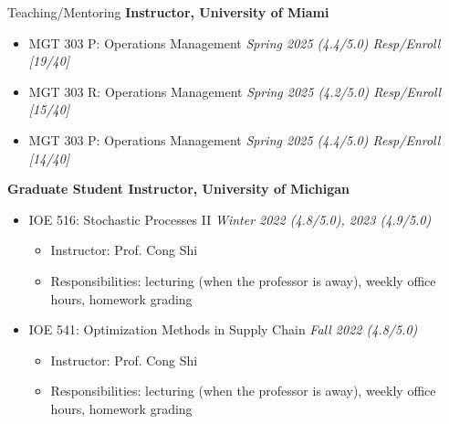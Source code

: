 \documentclass{resume}
\begin{document}
\begin{rSection}{Teaching/Mentoring} 
{\bf Instructor, University of Miami}
\begin{itemize}
    \item MGT 303 P: Operations Management \hfill {\em Spring 2025 (4.4/5.0) Resp/Enroll [19/40]}
    \item MGT 303 R: Operations Management \hfill {\em Spring 2025 (4.2/5.0) Resp/Enroll [15/40]}
    \item MGT 303 P: Operations Management \hfill {\em Spring 2025 (4.4/5.0) Resp/Enroll [14/40]}
\end{itemize}
{\bf Graduate Student Instructor, University of Michigan}
\begin{itemize}
        \item IOE 516: Stochastic Processes II \hfill {\em Winter 2022 (4.8/5.0), 2023 (4.9/5.0)}
        \begin{itemize}
            \item Instructor: Prof. Cong Shi
            \item Responsibilities: lecturing (when the professor is away), weekly office hours, homework grading
            
        \end{itemize}
        \item IOE 541:  Optimization Methods in Supply Chain \hfill {\em Fall 2022 (4.8/5.0)}
        \begin{itemize}
            \item Instructor: Prof. Cong Shi
            \item Responsibilities: lecturing (when the professor is away), weekly office hours, homework grading
            

\end{itemize}
\end{itemize}
\end{rSection}
\end{document}
